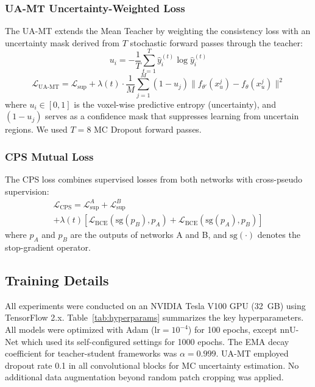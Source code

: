\documentclass[review,authoryear]{elsarticle}
\begin{document}
\subsubsection{UA-MT Uncertainty-Weighted Loss}
The UA-MT extends the Mean Teacher by weighting the consistency loss with an uncertainty mask derived from $T$ stochastic forward passes through the teacher:
\begin{equation}
u_i = -\frac{1}{T}\sum_{t=1}^{T} \hat{y}_i^{(t)} \log \hat{y}_i^{(t)}
\label{eq:uncertainty}
\end{equation}
\begin{equation}
\mathcal{L}_{\text{UA-MT}} = \mathcal{L}_{\text{sup}} + \lambda(t) \cdot \frac{1}{M}\sum_{j=1}^{M}(1 - u_j)\|f_{\theta'}(x_u^j) - f_\theta(x_u^j)\|^2
\label{eq:uamt}
\end{equation}
where $u_i \in [0, 1]$ is the voxel-wise predictive entropy (uncertainty), and $(1 - u_j)$ serves as a confidence mask that suppresses learning from uncertain regions. We used $T=8$ MC Dropout forward passes.

\subsubsection{CPS Mutual Loss}
The CPS loss combines supervised losses from both networks with cross-pseudo supervision:
\begin{multline}
\mathcal{L}_{\text{CPS}} = \mathcal{L}_{\text{sup}}^A + \mathcal{L}_{\text{sup}}^B \\
+ \lambda(t)\left[\mathcal{L}_{\text{BCE}}(\text{sg}(p_B), p_A) + \mathcal{L}_{\text{BCE}}(\text{sg}(p_A), p_B)\right]
\label{eq:cps}
\end{multline}
where $p_A$ and $p_B$ are the outputs of networks A and B, and $\text{sg}(\cdot)$ denotes the stop-gradient operator.

\subsection{Training Details}
All experiments were conducted on an NVIDIA Tesla V100 GPU (32~GB) using TensorFlow 2.x. Table~\ref{tab:hyperparams} summarizes the key hyperparameters. All models were optimized with Adam ($\text{lr} = 10^{-4}$) for 100 epochs, except nnU-Net which used its self-configured settings for 1000 epochs. The EMA decay coefficient for teacher-student frameworks was $\alpha = 0.999$. UA-MT employed dropout rate 0.1 in all convolutional blocks for MC uncertainty estimation. No additional data augmentation beyond random patch cropping was applied.
\end{document}
